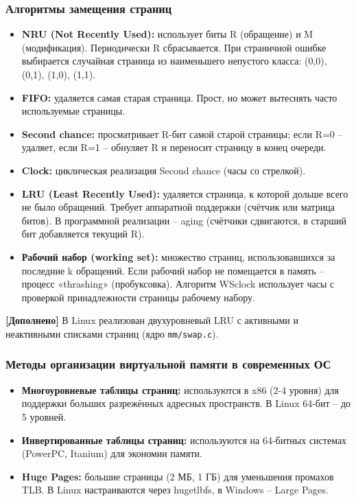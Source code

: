 \documentclass[a4paper,12pt]{article}
\begin{document}
\subsubsection{Алгоритмы замещения страниц}
\begin{itemize}
    \item \textbf{NRU (Not Recently Used):} использует биты R (обращение) и M (модификация). Периодически R сбрасывается. При страничной ошибке выбирается случайная страница из наименьшего непустого класса: (0,0), (0,1), (1,0), (1,1).
    \item \textbf{FIFO:} удаляется самая старая страница. Прост, но может вытеснять часто используемые страницы.
    \item \textbf{Second chance:} просматривает R-бит самой старой страницы; если R=0 – удаляет, если R=1 – обнуляет R и переносит страницу в конец очереди.
    \item \textbf{Clock:} циклическая реализация Second chance (часы со стрелкой).
    \item \textbf{LRU (Least Recently Used):} удаляется страница, к которой дольше всего не было обращений. Требует аппаратной поддержки (счётчик или матрица битов). В программной реализации – aging (счётчики сдвигаются, в старший бит добавляется текущий R).
    \item \textbf{Рабочий набор (working set):} множество страниц, использовавшихся за последние k обращений. Если рабочий набор не помещается в память – процесс «thrashing» (пробуксовка). Алгоритм WSclock использует часы с проверкой принадлежности страницы рабочему набору.
\end{itemize}
\textbf{[Дополнено]} В Linux реализован двухуровневый LRU с активными и неактивными списками страниц (ядро \texttt{mm/swap.c}).

\subsubsection{Методы организации виртуальной памяти в современных ОС}
\begin{itemize}
    \item \textbf{Многоуровневые таблицы страниц:} используются в x86 (2-4 уровня) для поддержки больших разрежённых адресных пространств. В Linux 64-бит – до 5 уровней.
    \item \textbf{Инвертированные таблицы страниц:} используются на 64-битных системах (PowerPC, Itanium) для экономии памяти.
    \item \textbf{Huge Pages:} большие страницы (2 МБ, 1 ГБ) для уменьшения промахов TLB. В Linux настраиваются через hugetlbfs, в Windows – Large Pages.
\end{itemize}
\end{document}
